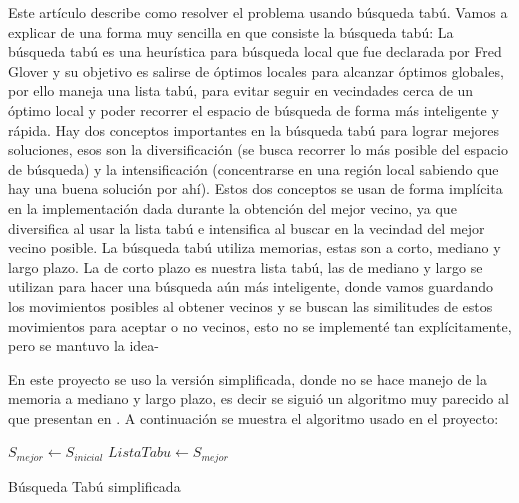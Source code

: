 \documentclass{article}
\begin{document}
Este artículo\cite{tabu} describe como resolver el problema usando búsqueda tabú. Vamos a explicar de una forma muy sencilla en que consiste la búsqueda tabú:
La búsqueda tabú es una heurística para búsqueda local que fue declarada por Fred Glover \cite{tabuglover} y su objetivo es salirse de óptimos locales para alcanzar óptimos globales, por ello maneja una lista tabú, para evitar seguir en vecindades cerca de un óptimo local y poder recorrer el espacio de búsqueda de forma más inteligente y rápida. Hay dos conceptos importantes en la búsqueda tabú para lograr mejores soluciones, esos son la diversificación (se busca recorrer lo más posible del espacio de búsqueda) y la intensificación (concentrarse en una región local sabiendo que hay una buena solución por ahí). Estos dos conceptos se usan  de forma implícita en la implementación dada durante la obtención del mejor vecino, ya que diversifica al usar la lista tabú e intensifica al buscar en la vecindad del mejor vecino posible. La búsqueda tabú utiliza memorias, estas son a corto, mediano y largo plazo. La de corto plazo es nuestra lista tabú, las de mediano y largo se utilizan para hacer una búsqueda aún más inteligente, donde vamos guardando los movimientos posibles al obtener vecinos y se buscan las similitudes de estos movimientos para aceptar o no vecinos, esto no se implementé tan explícitamente, pero se mantuvo la idea-

En este proyecto se uso la versión simplificada, donde no se hace manejo de la memoria a mediano y largo plazo, es decir se siguió un algoritmo muy parecido al que presentan en \cite{clever}. A continuación se muestra el algoritmo usado en el proyecto:

\begin{algorithm}[H]
	\SetAlgoLined
	$S_{mejor} \leftarrow S_{inicial}$
	$ListaTabu \leftarrow S_{mejor}$
	\caption{Búsqueda Tabú simplificada}
\end{algorithm}
\end{document}
